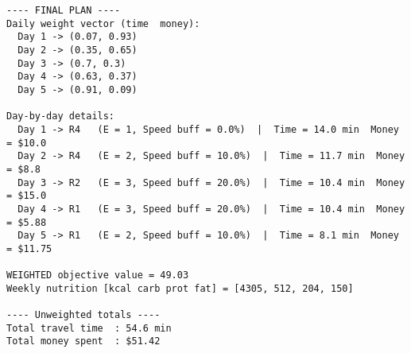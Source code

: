 \fontsize{10}{10}\selectfont

\begin{verbatim}
---- FINAL PLAN ----
Daily weight vector (time  money):
  Day 1 -> (0.07, 0.93)
  Day 2 -> (0.35, 0.65)
  Day 3 -> (0.7, 0.3)
  Day 4 -> (0.63, 0.37)
  Day 5 -> (0.91, 0.09)

Day‑by‑day details:
  Day 1 -> R4   (E = 1, Speed buff = 0.0%)  |  Time = 14.0 min  Money = $10.0
  Day 2 -> R4   (E = 2, Speed buff = 10.0%)  |  Time = 11.7 min  Money = $8.8
  Day 3 -> R2   (E = 3, Speed buff = 20.0%)  |  Time = 10.4 min  Money = $15.0
  Day 4 -> R1   (E = 3, Speed buff = 20.0%)  |  Time = 10.4 min  Money = $5.88
  Day 5 -> R1   (E = 2, Speed buff = 10.0%)  |  Time = 8.1 min  Money = $11.75

WEIGHTED objective value = 49.03
Weekly nutrition [kcal carb prot fat] = [4305, 512, 204, 150]

---- Unweighted totals ----
Total travel time  : 54.6 min
Total money spent  : $51.42

\end{verbatim}
